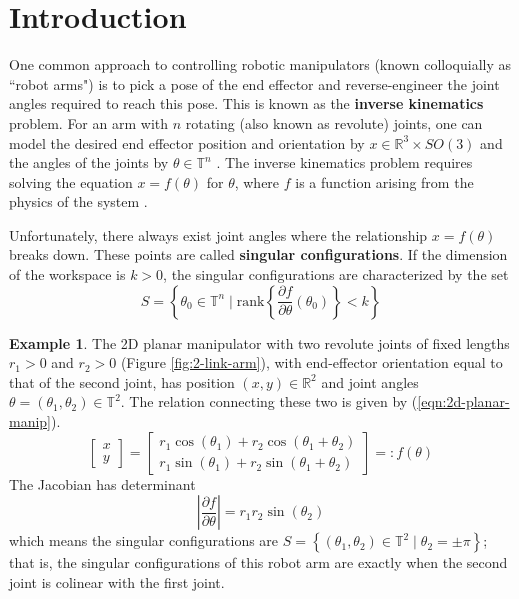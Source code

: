 \documentclass[12pt]{article}
\theoremstyle{definition}
\newtheorem{example}{Example}
\begin{document}
    
\section{Introduction}
One common approach to controlling robotic manipulators 
(known colloquially as ``robot arms") is to pick a pose of the end effector and
reverse-engineer the joint angles required to reach this pose. This is known as
the \textbf{inverse kinematics} problem. For an arm with \(n\) rotating 
(also known as revolute) joints, one can model the desired end effector position
and orientation by \(x \in \mathbb{R}^3 \times SO(3)\) and the angles of the
joints by \(\theta \in \mathbb{T}^n\) \cite{robots-fiber-bundles}. 
The inverse kinematics problem requires solving the
equation \(x = f(\theta)\) for \(\theta\), where \(f\) is a
function arising from the physics of the system \cite{program-kin-red-manips}.

Unfortunately, there always exist joint angles where the relationship 
\(x = f(\theta)\) breaks down. These points are called 
\textbf{singular configurations}. If the dimension of the workspace is 
\(k > 0\), the singular configurations are characterized by the set
\[
    S = \left\{ \theta_0 \in \mathbb{T}^n \mid 
    \text{rank}\left\{
        \frac{\partial f}{\partial\theta}(\theta_0) 
    \right\} < k \right\}
\]

\begin{example}
    The 2D planar manipulator with two revolute joints of fixed lengths \(r_1 > 0\)
    and \(r_2 > 0\) (Figure \ref{fig:2-link-arm}), with end-effector orientation
    equal to that of the second joint,
    has position \((x,y) \in \mathbb{R}^2\) and joint angles 
    \(\theta = (\theta_1,\theta_2) \in \mathbb{T}^2\). 
    The relation connecting these two is given by (\ref{eqn:2d-planar-manip}).
    \begin{equation}\label{eqn:2d-planar-manip}
        \begin{bmatrix}x \\ y \end{bmatrix}
        = \begin{bmatrix} 
            r_1\cos(\theta_1) + r_2\cos(\theta_1 + \theta_2) \\
            r_1\sin(\theta_1) + r_2\sin(\theta_1 + \theta_2)
        \end{bmatrix} =: f(\theta)
    \end{equation}
    The Jacobian has determinant
    \[
        \left| \frac{\partial f}{\partial \theta} \right| = r_1r_2\sin(\theta_2)
    \]
    which means the singular configurations are 
    \(S = \left\{ (\theta_1,\theta_2) \in \mathbb{T}^2 \mid \theta_2 = \pm\pi\right\}\); 
    that is, the singular configurations of this robot arm are exactly when the
    second joint is colinear with the first joint.
\end{example}
\end{document}
